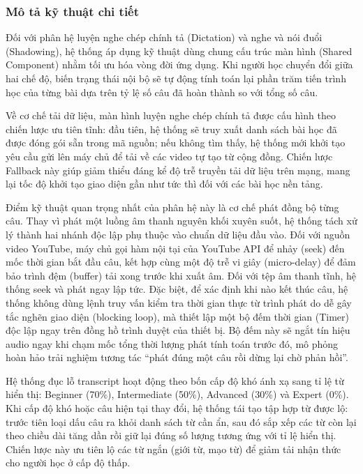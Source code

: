 \subsubsection{Mô tả kỹ thuật chi tiết}

Đối với phân hệ luyện nghe chép chính tả (Dictation) và nghe và nói đuổi (Shadowing), hệ thống áp dụng kỹ thuật dùng chung cấu trúc màn hình (Shared Component) nhằm tối ưu hóa vòng đời ứng dụng. Khi người học chuyển đổi giữa hai chế độ, biến trạng thái nội bộ sẽ tự động tính toán lại phần trăm tiến trình học của từng bài dựa trên tỷ lệ số câu đã hoàn thành so với tổng số câu.

\begin{sloppypar}
Về cơ chế tải dữ liệu, màn hình luyện nghe chép chính tả được cấu hình theo chiến lược ưu tiên tĩnh: đầu tiên, hệ thống sẽ truy xuất danh sách bài học đã được đóng gói sẵn trong mã nguồn; nếu không tìm thấy, hệ thống mới khởi tạo yêu cầu gửi lên máy chủ để tải về các video tự tạo từ cộng đồng. Chiến lược Fallback này giúp giảm thiểu đáng kể độ trễ truyền tải dữ liệu trên mạng, mang lại tốc độ khởi tạo giao diện gần như tức thì đối với các bài học nền tảng.
\end{sloppypar}

\begin{sloppypar}
Điểm kỹ thuật quan trọng nhất của phân hệ này là cơ chế phát đồng bộ từng câu. Thay vì phát một luồng âm thanh nguyên khối xuyên suốt, hệ thống tách xử lý thành hai nhánh độc lập phụ thuộc vào chuẩn dữ liệu đầu vào. Đối với nguồn video YouTube, máy chủ gọi hàm nội tại của YouTube API để nhảy (seek) đến mốc thời gian bắt đầu câu, kết hợp cùng một độ trễ vi giây (micro-delay) để đảm bảo trình đệm (buffer) tải xong trước khi xuất âm. Đối với tệp âm thanh tĩnh, hệ thống seek và phát ngay lập tức. Đặc biệt, để xác định khi nào kết thúc câu, hệ thống không dùng lệnh truy vấn kiểm tra thời gian thực từ trình phát do dễ gây tắc nghẽn giao diện (blocking loop), mà thiết lập một bộ đếm thời gian (Timer) độc lập ngay trên đồng hồ trình duyệt của thiết bị. Bộ đếm này sẽ ngắt tín hiệu audio ngay khi chạm mốc tổng thời lượng phát tính toán trước đó, mô phỏng hoàn hảo trải nghiệm tương tác ``phát đúng một câu rồi dừng lại chờ phản hồi''.
\end{sloppypar}

\begin{sloppypar}
Hệ thống đục lỗ transcript hoạt động theo bốn cấp độ khó ánh xạ sang tỉ lệ từ hiển thị: Beginner (70\%), Intermediate (50\%), Advanced (30\%) và Expert (0\%). Khi cấp độ khó hoặc câu hiện tại thay đổi, hệ thống tái tạo tập hợp từ được lộ: trước tiên loại dấu câu ra khỏi danh sách từ cần ẩn, sau đó sắp xếp các từ còn lại theo chiều dài tăng dần rồi giữ lại đúng số lượng tương ứng với tỉ lệ hiển thị. Chiến lược này ưu tiên lộ các từ ngắn (giới từ, mạo từ) để giảm tải nhận thức cho người học ở cấp độ thấp.
\end{sloppypar}

